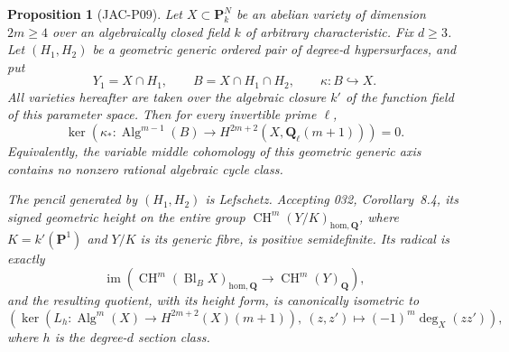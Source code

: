 \documentclass[11pt,a4paper]{article}
\newtheorem{proposition}[theorem]{Proposition}
\begin{document}
\begin{proposition}[JAC-P09]
\label{jac:P09}
Let $X\subset\mathbf P^N_k$ be an abelian variety of dimension
$2m\ge4$ over an algebraically closed field $k$ of arbitrary
characteristic. Fix $d\ge3$. Let $(H_1,H_2)$ be a geometric generic
ordered pair of degree-$d$ hypersurfaces, and put
\[
 Y_1=X\cap H_1,\qquad B=X\cap H_1\cap H_2,
 \qquad \kappa:B\hookrightarrow X.
\]
All varieties hereafter are taken over the algebraic closure $k'$ of
the function field of this parameter space. Then for every invertible
prime $\ell$,
\[
 \ker\!\left(\kappa_*:\operatorname{Alg}^{m-1}(B)
             \longrightarrow H^{2m+2}(X,\mathbf Q_\ell(m+1))\right)=0.
                                                        \tag{JAC.P09.1}
\]
Equivalently, the variable middle cohomology of this geometric generic
axis contains no nonzero rational algebraic cycle class.

The pencil generated by $(H_1,H_2)$ is Lefschetz. Accepting 032,
Corollary~8.4, its signed geometric height on the entire group
$\operatorname{CH}^{m}(Y/K)_{\mathrm{hom},\mathbf Q}$, where
$K=k'(\mathbf P^1)$ and $Y/K$ is its generic fibre, is positive
semidefinite. Its radical is exactly
\[
 \operatorname{im}\!\left(
  \operatorname{CH}^{m}(\operatorname{Bl}_B X)_{
       \mathrm{hom},\mathbf Q}
     \longrightarrow\operatorname{CH}^{m}(Y)_{\mathbf Q}\right),
                                                        \tag{JAC.P09.2}
\]
and the resulting quotient, with its height form, is canonically
isometric to
\[
 \left(\ker\!\left(L_h:\operatorname{Alg}^{m}(X)
                        \longrightarrow H^{2m+2}(X)(m+1)\right),
       \ (z,z')\longmapsto(-1)^m\deg_X(zz')\right),
                                                        \tag{JAC.P09.3}
\]
where $h$ is the degree-$d$ section class.
\end{proposition}
\end{document}

